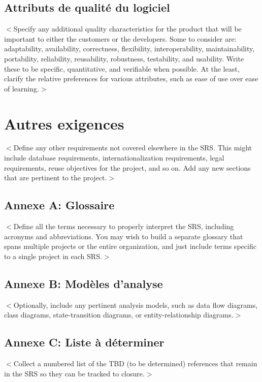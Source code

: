 \documentclass[titlepage, 12pt]{report}
\begin{document}
\section{Attributs de qualité du logiciel}
$<$Specify any additional quality characteristics for the product that will be 
important to either the customers or the developers. Some to consider are: 
adaptability, availability, correctness, flexibility, interoperability, 
maintainability, portability, reliability, reusability, robustness, testability, 
and usability. Write these to be specific, quantitative, and verifiable when 
possible. At the least, clarify the relative preferences for various attributes, 
such as ease of use over ease of learning.$>$

\chapter{Autres exigences}
$<$Define any other requirements not covered elsewhere in the SRS. This might 
include database requirements, internationalization requirements, legal 
requirements, reuse objectives for the project, and so on. Add any new sections 
that are pertinent to the project.$>$

\section{Annexe A: Glossaire}
$<$Define all the terms necessary to properly interpret the SRS, including 
acronyms and abbreviations. You may wish to build a separate glossary that spans 
multiple projects or the entire organization, and just include terms specific to 
a single project in each SRS.$>$

\section{Annexe B: Modèles d'analyse}
$<$Optionally, include any pertinent analysis models, such as data flow 
diagrams, class diagrams, state-transition diagrams, or entity-relationship 
diagrams.$>$

\section{Annexe C: Liste à déterminer}
$<$Collect a numbered list of the TBD (to be determined) references that remain 
in the SRS so they can be tracked to closure.$>$
\end{document}
